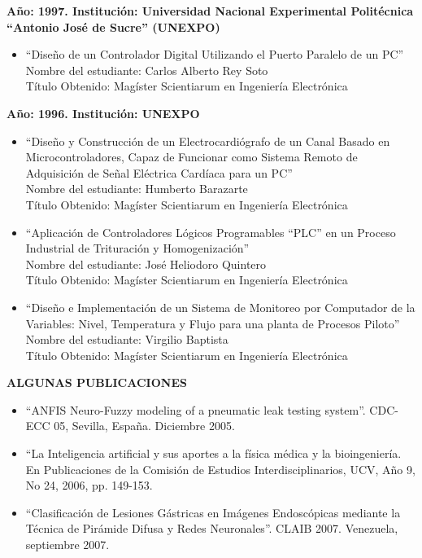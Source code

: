 \begin{footnotesize}
\begin{flushleft}
\textbf{Año: 1997. Institución: Universidad Nacional Experimental Politécnica “Antonio José de Sucre” (UNEXPO)}\\
\begin{itemize}
\item “Diseño de un Controlador Digital Utilizando el Puerto Paralelo de un PC”\\
Nombre del estudiante: Carlos  Alberto Rey Soto\\
Título Obtenido: Magíster Scientiarum en Ingeniería Electrónica  
\end{itemize}

\textbf{Año: 1996.  Institución: UNEXPO}\\ 
\begin{itemize}
\item “Diseño y Construcción de un Electrocardiógrafo de un Canal Basado en Microcontroladores, Capaz de Funcionar como Sistema Remoto de Adquisición de Señal Eléctrica Cardíaca para un PC”\\ 
Nombre del estudiante: Humberto Barazarte\\
Título Obtenido: Magíster Scientiarum en Ingeniería Electrónica 
\item “Aplicación de Controladores Lógicos Programables “PLC”  en un Proceso Industrial de Trituración y Homogenización”\\ 
Nombre del estudiante: José Heliodoro Quintero\\
Título Obtenido: Magíster Scientiarum en Ingeniería Electrónica 
\item “Diseño e Implementación de un Sistema de Monitoreo por Computador de la Variables: Nivel, Temperatura y Flujo para una planta de Procesos Piloto”\\
Nombre del estudiante: Virgilio Baptista\\
Título Obtenido: Magíster Scientiarum en Ingeniería Electrónica 
\end{itemize}
 \end{flushleft}
\textbf{  ALGUNAS PUBLICACIONES}
\begin{flushleft}
\begin{itemize}
\item “ANFIS Neuro-Fuzzy modeling of a pneumatic leak testing system”. CDC-ECC 05, Sevilla, España. Diciembre 2005.
\item “La Inteligencia artificial y sus aportes a la física médica y la bioingeniería. En Publicaciones de la Comisión de Estudios Interdisciplinarios, UCV, Año 9, No 24, 2006, pp. 149-153.
\item “Clasificación de Lesiones Gástricas en Imágenes Endoscópicas mediante la Técnica de Pirámide Difusa  y Redes Neuronales”. CLAIB 2007. Venezuela, septiembre 2007.

\end{itemize}
\end{flushleft}
\end{footnotesize}
